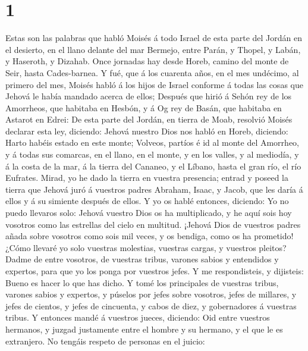\hypertarget{section}{%
\section{1}\label{section}}

 Estas son las palabras que habló Moisés á todo Israel de
esta parte del Jordán en el desierto, en el llano delante del mar
Bermejo, entre Parán, y Thopel, y Labán, y Haseroth, y Dizahab.
 Once jornadas hay desde Horeb, camino del monte de Seir,
hasta Cades-barnea.  Y fué, que á los cuarenta años, en el
mes undécimo, al primero del mes, Moisés habló á los hijos de Israel
conforme á todas las cosas que Jehová le había mandado acerca de ellos;
 Después que hirió á Sehón rey de los Amorrheos, que
habitaba en Hesbón, y á Og rey de Basán, que habitaba en Astarot en
Edrei:  De esta parte del Jordán, en tierra de Moab,
resolvió Moisés declarar esta ley, diciendo:  Jehová nuestro
Dios nos habló en Horeb, diciendo: Harto habéis estado en este monte;
 Volveos, partíos é id al monte del Amorrheo, y á todas sus
comarcas, en el llano, en el monte, y en los valles, y al mediodía, y á
la costa de la mar, á la tierra del Cananeo, y el Líbano, hasta el gran
río, el río Eufrates.  Mirad, yo he dado la tierra en
vuestra presencia; entrad y poseed la tierra que Jehová juró á vuestros
padres Abraham, Isaac, y Jacob, que les daría á ellos y á su simiente
después de ellos.  Y yo os hablé entonces, diciendo: Yo no
puedo llevaros solo:  Jehová vuestro Dios os ha
multiplicado, y he aquí sois hoy vosotros como las estrellas del cielo
en multitud.  ¡Jehová Dios de vuestros padres añada sobre
vosotros como sois mil veces, y os bendiga, como os ha prometido!
 ¿Cómo llevaré yo solo vuestras molestias, vuestras cargas,
y vuestros pleitos?  Dadme de entre vosotros, de vuestras
tribus, varones sabios y entendidos y expertos, para que yo los ponga
por vuestros jefes.  Y me respondisteis, y dijisteis: Bueno
es hacer lo que has dicho.  Y tomé los principales de
vuestras tribus, varones sabios y expertos, y púselos por jefes sobre
vosotros, jefes de millares, y jefes de cientos, y jefes de cincuenta, y
cabos de diez, y gobernadores á vuestras tribus.  Y
entonces mandé á vuestros jueces, diciendo: Oid entre vuestros hermanos,
y juzgad justamente entre el hombre y su hermano, y el que le es
extranjero.  No tengáis respeto de personas en el juicio:
